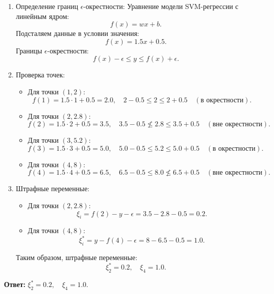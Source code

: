 \begin{enumerate}
\item Определение границ \(\epsilon\)-окрестности:
   Уравнение модели SVM-регрессии с линейным ядром: 
   \begin{equation*}
    f(x) = wx + b.
   \end{equation*}
   Подсталяем данные в условии значения:
   \begin{equation*}
    f(x) = 1.5x + 0.5.
   \end{equation*}
   Границы \(\epsilon\)-окрестности:
   \begin{equation*}
    f(x) - \epsilon \leq y \leq f(x) + \epsilon.
   \end{equation*}
\item Проверка точек:
\begin{itemize}
    \item Для точки \((1, 2)\): 
    \begin{equation*}
        f(1) = 1.5 \cdot 1 + 0.5 = 2.0, \quad 2 - 0.5 \leq 2 \leq 2 + 0.5 \quad (\text{в окрестности}).
    \end{equation*}
    \item Для точки \((2, 2.8)\): 
    \begin{equation*}
        f(2) = 1.5 \cdot 2 + 0.5 = 3.5, \quad 3.5 - 0.5 \not\leq 2.8 \leq 3.5 + 0.5 \quad (\text{вне окрестности}).
    \end{equation*}
    \item Для точки \((3, 5.2)\): 
    \begin{equation*}
        f(3) = 1.5 \cdot 3 + 0.5 = 5.0, \quad 5.0 - 0.5 \leq 5.2 \leq 5.0 + 0.5 \quad (\text{в окрестности}).
    \end{equation*}
    \item Для точки \((4, 8)\): 
    \begin{equation*}
        f(4) = 1.5 \cdot 4 + 0.5 = 6.5, \quad 6.5 - 0.5 \leq 8.0 \not\leq 6.5 + 0.5 \quad (\text{вне окрестности}).
    \end{equation*}
\end{itemize}
\item Штрафные переменные:
\begin{itemize}
    \item Для точки \((2, 2.8)\):
    \begin{equation*}
        \xi_i = f(2) - y - \epsilon = 3.5 - 2.8 - 0.5 = 0.2.
    \end{equation*}
    \item Для точки \((4, 8)\):
    \begin{equation*}
        \xi_i^* = y - f(4) - \epsilon = 8 - 6.5 - 0.5 = 1.0.
    \end{equation*}
\end{itemize}
Таким образом, штрафные переменные:
\begin{equation*}
    \xi_2^* = 0.2, \quad \xi_4 = 1.0.
\end{equation*}
\end{enumerate}
\par \noindent \textbf{Ответ:} \(\xi_2^* = 0.2, \quad \xi_4 = 1.0.\)


